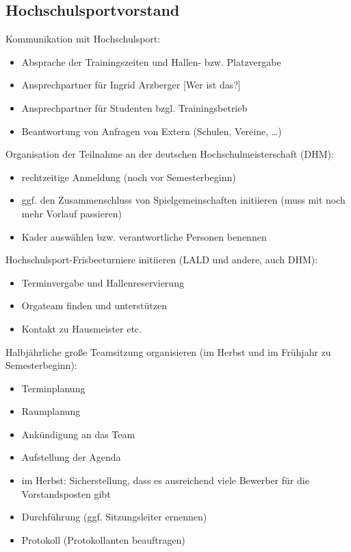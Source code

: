 \documentclass[a4 paper, 11pt]{article}
\begin{document}
\subsection{Hochschulsportvorstand}
Kommunikation mit Hochschulsport:
\begin{itemize}
	\item Absprache der Trainingszeiten und Hallen- bzw. Platzvergabe
	\item Ansprechpartner für Ingrid Arzberger [Wer ist das?]
	\item Ansprechpartner für Studenten bzgl. Trainingsbetrieb
	\item Beantwortung von Anfragen von Extern (Schulen, Vereine, \dots)
\end{itemize}
\vspace{0.3cm}
Organisation der Teilnahme an der deutschen Hochschulmeisterschaft (DHM):
\begin{itemize}
	\item rechtzeitige Anmeldung (noch vor Semesterbeginn)
	\item ggf. den Zusammenschluss von Spielgemeinschaften initiieren (muss mit noch mehr Vorlauf passieren)
	\item Kader auswählen bzw. verantwortliche Personen benennen
\end{itemize}
\vspace{0.3cm}
Hochschulsport-Frisbeeturniere initiieren (LALD und andere, auch DHM):
\begin{itemize}
	\item Terminvergabe und Hallenreservierung
	\item Orgateam finden und unterstützen
	\item Kontakt zu Hausmeister etc.
\end{itemize}
\vspace{0.3cm}
Halbjährliche große Teamsitzung organisieren (im Herbst und im Frühjahr zu Semesterbeginn):
\begin{itemize}
	\item Terminplanung
	\item Raumplanung
	\item Ankündigung an das Team
	\item Aufstellung der Agenda
	\item im Herbst: Sicherstellung, dass es ausreichend viele Bewerber für die Vorstandsposten gibt
	\item Durchführung (ggf. Sitzungsleiter ernennen)
	\item Protokoll (Protokollanten beauftragen)
\end{itemize}
\end{document}
